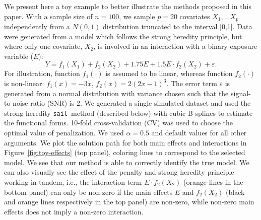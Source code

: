 \documentclass[useAMS,usenatbib,referee]{biom}
\newcommand{\sail}{\texttt{sail}}
\begin{document}
We present here a toy example to better illustrate the methods proposed in this paper. 
With a sample size of $n=100$, we sample $p=20$ covariates $X_1, \ldots X_p$ independently from a $N(0,1)$ distribution truncated to the interval [0,1]. 
Data were generated from a model which follows the strong heredity principle, but where only one covariate, $X_2$, is involved in an interaction with a binary exposure variable ($E$): 
\[Y = f_1(X_1) + f_2(X_2) + 1.75 E + 1.5 E \cdot f_2(X_2) + \varepsilon.\]
For illustration, function $f_1(\cdot)$ is assumed to be linear, whereas function $f_2(\cdot)$ is non-linear: $f_1(x) = -3x$, $f_2(x) = 2(2x-1)^3$. 
The error term $\varepsilon$ is generated from a normal distribution with variance chosen such that the signal-to-noise ratio (SNR) is 2. 
We generated a single simulated dataset and used the strong heredity \sail ~method (described below) with cubic B-splines to estimate the functional forms. 
10-fold cross-validation (CV) was used to choose the optimal value of penalization. We used $\alpha=0.5$ and default values for all other arguments. 
We plot the solution path for both main effects and interactions in Figure~\ref{fig:toy-effects} (top panel), coloring lines to correspond to the selected model. We see that our method is able to correctly identify the true model. 
We can also visually see the effect of the penalty and strong heredity principle working in tandem, i.e., the interaction term $E \cdot f_2(X_2)$ (orange lines in the bottom panel) can only be non-zero if the main effects $E$ and $f_2(X_2)$ (black and orange lines respectively in the top panel) are non-zero, while non-zero main effects does not imply a non-zero interaction.



%
%
%
\end{document}
